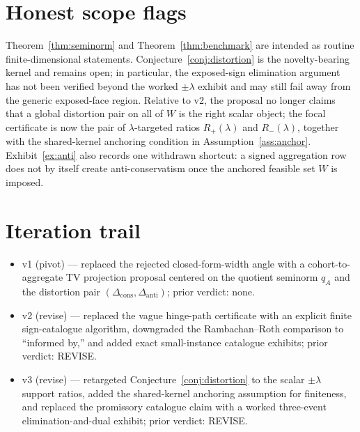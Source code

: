 \documentclass[11pt]{article}
\theoremstyle{definition}
\theoremstyle{plain}
\theoremstyle{remark}
\begin{document}
\section{Honest scope flags}
Theorem~\ref{thm:seminorm} and Theorem~\ref{thm:benchmark} are intended as routine finite-dimensional statements. Conjecture~\ref{conj:distortion} is the novelty-bearing kernel and remains open; in particular, the exposed-sign elimination argument has not been verified beyond the worked \(\pm\lambda\) exhibit and may still fail away from the generic exposed-face region. Relative to v2, the proposal no longer claims that a global distortion pair on all of \(W\) is the right scalar object; the focal certificate is now the pair of \(\lambda\)-targeted ratios \(R_+(\lambda)\) and \(R_-(\lambda)\), together with the shared-kernel anchoring condition in Assumption~\ref{ass:anchor}. Exhibit~\ref{ex:anti} also records one withdrawn shortcut: a signed aggregation row does not by itself create anti-conservatism once the anchored feasible set \(W\) is imposed.

\section{Iteration trail}
\begin{itemize}[leftmargin=*]
\item v1 (pivot) --- replaced the rejected closed-form-width angle with a cohort-to-aggregate TV projection proposal centered on the quotient seminorm \(q_A\) and the distortion pair \((\Delta_{\mathrm{cons}},\Delta_{\mathrm{anti}})\); prior verdict: none.
\item v2 (revise) --- replaced the vague hinge-path certificate with an explicit finite sign-catalogue algorithm, downgraded the Rambachan--Roth comparison to ``informed by,'' and added exact small-instance catalogue exhibits; prior verdict: REVISE.
\item v3 (revise) --- retargeted Conjecture~\ref{conj:distortion} to the scalar \(\pm\lambda\) support ratios, added the shared-kernel anchoring assumption for finiteness, and replaced the promissory catalogue claim with a worked three-event elimination-and-dual exhibit; prior verdict: REVISE.
\end{itemize}
\end{document}
